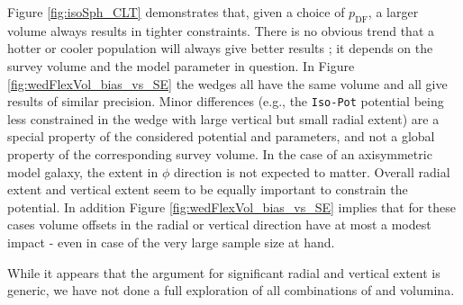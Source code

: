 
Figure \ref{fig:isoSph_CLT} demonstrates that, given a choice of $p_\text{DF}$, a larger volume always results in tighter constraints. There is no obvious trend that a hotter or cooler population will always give better results ; it depends on the survey volume and the model parameter in question. In Figure \ref{fig:wedFlexVol_bias_vs_SE} the wedges all have the same volume and all give results of similar precision. Minor differences (e.g., the \texttt{Iso-Pot} potential being less constrained in the wedge with large vertical but small radial extent) are a special property of the considered potential and parameters, and not a global property of the corresponding survey volume. In the case of an axisymmetric model galaxy, the extent in $\phi$ direction is not expected to matter. Overall radial extent and vertical extent seem to be equally important to constrain the potential. In addition Figure \ref{fig:wedFlexVol_bias_vs_SE} implies that for these cases volume offsets in the radial or vertical direction have at most a modest impact - even in case of the very large sample size at hand.

While it appears that the argument for significant radial and vertical extent is generic, we have not done a full exploration of all combinations of \pmodel{} and volumina.


